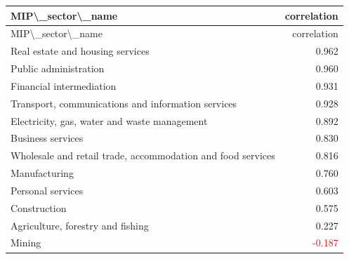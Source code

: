 \begin{longtable}{lr}
\hline
MIP\textbackslash{}_sector\textbackslash{}_name & correlation \\ 
\hline\endfirsthead
\hline
MIP\textbackslash{}_sector\textbackslash{}_name & correlation \\ 
\hline\endhead
Real estate and housing services & 0.962 \\ 
Public administration & 0.960 \\ 
Financial intermediation & 0.931 \\ 
Transport, communications and information services & 0.928 \\ 
Electricity, gas, water and waste management & 0.892 \\ 
Business services & 0.830 \\ 
Wholesale and retail trade, accommodation and food services & 0.816 \\ 
Manufacturing & 0.760 \\ 
Personal services & 0.603 \\ 
Construction & 0.575 \\ 
Agriculture, forestry and fishing & 0.227 \\ 
Mining & \textcolor{red}{-0.187} \\ 
\hline
\end{longtable}
